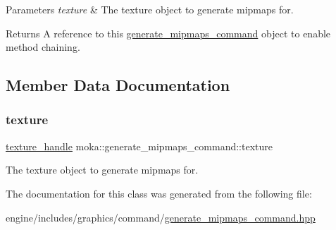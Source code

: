 \begin{DoxyParams}{Parameters}
{\em texture} & The texture object to generate mipmaps for. \\
\hline
\end{DoxyParams}
\begin{DoxyReturn}{Returns}
A reference to this \mbox{\hyperlink{classmoka_1_1generate__mipmaps__command}{generate\+\_\+mipmaps\+\_\+command}} object to enable method chaining. 
\end{DoxyReturn}


\subsection{Member Data Documentation}
\mbox{\label{classmoka_1_1generate__mipmaps__command_aef2a378b2152cf24609a979a0673358a}} 
\subsubsection{\texorpdfstring{texture}{texture}}
{\footnotesize\ttfamily \mbox{\hyperlink{structmoka_1_1texture__handle}{texture\+\_\+handle}} moka\+::generate\+\_\+mipmaps\+\_\+command\+::texture}

The texture object to generate mipmaps for. 

The documentation for this class was generated from the following file\+:\begin{DoxyCompactItemize}
\item 
engine/includes/graphics/command/\mbox{\hyperlink{generate__mipmaps__command_8hpp}{generate\+\_\+mipmaps\+\_\+command.\+hpp}}\end{DoxyCompactItemize}
